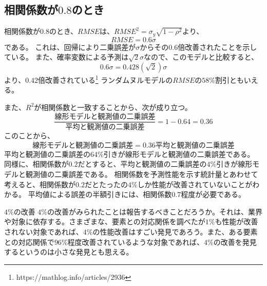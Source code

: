 \subsection{相関係数が$0.8$のとき}
相関係数が$0.8$のとき、$RMSE$は、$RMSE^2 = \sigma_y\sqrt{1-\rho^2}$より、
\begin{equation*}
 RMSE = 0.6\sigma
\end{equation*}
である。
これは、回帰により二乗誤差が$\sigma$からその$0.6$倍改善されたことを示している。
また、確率変数による予測は$\sqrt{2}\sigma$なので、このモデルと比較すると、
\begin{equation*}
 0.6\sigma = 0.428(\sqrt{2})\sigma
\end{equation*}
より、$0.42倍$改善されている\footnote{https://mathlog.info/articles/2936}
ランダムヌルモデルの$RMSE$の$58\%$割引ともいえる。

また、$R^2$が相関係数と一致することから、次が成り立つ。
\begin{equation*}
 \frac{線形モデルと観測値の二乗誤差}{平均と観測値の二乗誤差} = 1-0.64 = 0.36
\end{equation*}
このことから、
\begin{equation*}
 線形モデルと観測値の二乗誤差 = 0.36平均と観測値の二乗誤差
\end{equation*}
平均と観測値の二乗誤差の$64\%$引きが線形モデルと観測値の二乗誤差である。
同様に、相関係数が$0.2$だとすると、平均と観測値の二乗誤差の$4\%$引きが線形モデルと観測値の二乗誤差である。
相関係数を予測性能を示す統計量とあわせて考えると、相関係数が$0.2$だとたったの$4\%$しか性能が改善されていないことがわかる。
平均値による誤差の半額引きには、相関係数$0.7$程度が必要である。

\begin{SMbox}{$4\%$の改善}
 $4\%$の改善がみられたことは報告するべきことだろうか。それは、業界や対象に依存する。さまざまな、要素との対応関係を調べたが$1\%$も性能が改善されない対象であれば、$4\%$の性能改善はすごい発見であろう。また、ある要素との対応関係で$96\%$程度改善されているような対象であれば、$4\%$の改善を発見するというのは小さな発見とも思える。

\end{SMbox}


